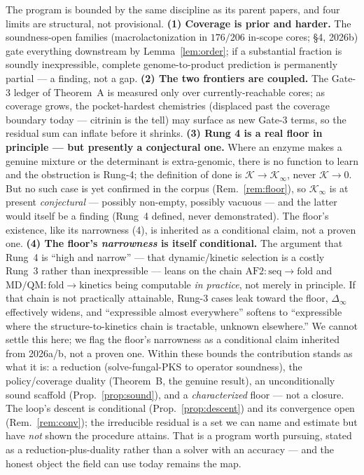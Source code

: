 \documentclass[11pt]{article}
\theoremstyle{plain}
\theoremstyle{definition}
\begin{document}
The program is bounded by the same discipline as its parent papers, and four limits are structural, not provisional. \textbf{(1) Coverage is prior and harder.} The soundness-open families (macrolactonization in $176/206$ in-scope cores; \S4, 2026b) gate everything downstream by Lemma~\ref{lem:order}; if a substantial fraction is soundly inexpressible, complete genome-to-product prediction is permanently partial --- a finding, not a gap. \textbf{(2) The two frontiers are coupled.} The Gate-3 ledger of Theorem~A is measured only over currently-reachable cores; as coverage grows, the pocket-hardest chemistries (displaced past the coverage boundary today --- citrinin is the tell) may surface as new Gate-3 terms, so the residual sum can inflate before it shrinks. \textbf{(3) Rung 4 is a real floor in principle --- but presently a conjectural one.} Where an enzyme makes a genuine mixture or the determinant is extra-genomic, there is no function to learn and the obstruction is Rung-4; the definition of done is $\mathcal{K}\!\to\!\mathcal{K}_\infty$, never $\mathcal{K}\!\to\!0$. But no such case is yet confirmed in the corpus (Rem.~\ref{rem:floor}), so $\mathcal{K}_\infty$ is at present \emph{conjectural} --- possibly non-empty, possibly vacuous --- and the latter would itself be a finding (Rung~4 defined, never demonstrated). The floor's existence, like its narrowness (4), is inherited as a conditional claim, not a proven one. \textbf{(4) The floor's \emph{narrowness} is itself conditional.} The argument that Rung~4 is ``high and narrow'' --- that dynamic/kinetic selection is a costly Rung~3 rather than inexpressible --- leans on the chain $\text{AF2}:\text{seq}\to\text{fold}$ and $\text{MD/QM}:\text{fold}\to\text{kinetics}$ being computable \emph{in practice}, not merely in principle. If that chain is not practically attainable, Rung-3 cases leak toward the floor, $\Delta_\infty$ effectively widens, and ``expressible almost everywhere'' softens to ``expressible where the structure-to-kinetics chain is tractable, unknown elsewhere.'' We cannot settle this here; we flag the floor's narrowness as a conditional claim inherited from 2026a/b, not a proven one. Within these bounds the contribution stands as what it is: a reduction (solve-fungal-PKS to operator soundness), the policy/coverage duality (Theorem~B, the genuine result), an unconditionally sound scaffold (Prop.~\ref{prop:sound}), and a \emph{characterized} floor --- not a closure. The loop's descent is conditional (Prop.~\ref{prop:descent}) and its convergence open (Rem.~\ref{rem:conv}); the irreducible residual is a set we can name and estimate but have \emph{not} shown the procedure attains. That is a program worth pursuing, stated as a reduction-plus-duality rather than a solver with an accuracy --- and the honest object the field can use today remains the map.
\end{document}
